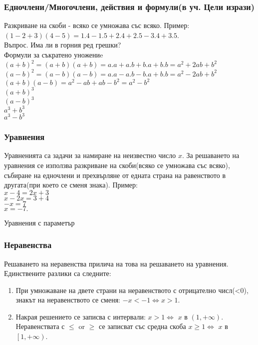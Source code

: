 \documentclass{article}
\theoremstyle{plain}
\begin{document}
	\subsubsection{Едночлени/Многочлени, действия и формули(в уч. Цели изрази)}
	Разкриване на скоби - всяко се умножава със всяко. Пример:\\
	$(1-2+3)(4-5) = 1.4 - 1.5 + 2.4 + 2.5 - 3.4 + 3.5$. \\
	Въпрос. Има ли в горния ред грешки?\\
	
	Формули за съкратено уножениe \\
	$(a+b)^2 = (a+b)(a+b)=a.a + a.b + b.a + b.b = a^2 + 2ab + b^2 $ \\
	$(a-b)^2 = (a-b)(a-b)=a.a - a.b - b.a + b.b = a^2 - 2ab + b^2 $\\
	$(a+b)(a-b)= a^2 - ab + ab - b^2 = a^2 - b^2 $\\	
	$(a+b)^3 $\\
	$(a-b)^3 $\\
	$a^3 + b^3 $\\
	$a^3 - b^3 $
	
	\subsubsection{Уравнения}
	Уравненията са задачи за намиране на неизвестно число $x$. За решаването на уравнения се използва разкриване на скоби(всяко се умножава със всяко), събиране на едночлени и прехвърляне от едната страна на равенството в другата(при което се сменя знака).
	Пример: \\
	$ x - 4 = 2x + 3$ \\
	$ x - 2x = 3 + 4 $ \\
	$ -x = 7 $ \\
	$ x = -7. $ 
	
	Уравнения с параметър
	\subsubsection{Неравенства}
	Решаването на неравенства прилича на това на решаването на уравнения. Единствените разлики са следните:
	\begin{enumerate}
		\item При умножаване на двете страни на неравенството с отрицателно числ(<0), знакът на неравенството се сменя: $-x<-1  \iff x> 1$.
		\item Накрая решението се записва с интервали: $x>1 \iff$ $x$ в $ (1,+\infty) $.
		Неравенствата с $\leq$ or $\geq$ се записват със средна скоба $x \geq1 \iff$ $x$ в $ \left[1,+\infty \right) $.
	\end{enumerate}
	
\end{document}
